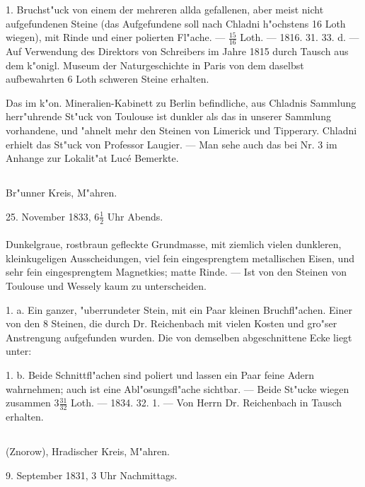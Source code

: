 \documentclass[a4paper, 11pt, oneside, polutonikogreek, german]{article}
\begin{document}
1. Bruchst"uck von einem der mehreren allda gefallenen, aber meist nicht aufgefundenen Steine (das Aufgefundene soll nach Chladni h"ochstens 16 Loth wiegen), mit Rinde und einer polierten Fl"ache. --- $\mathfrak{\frac{15}{16}}$ Loth. --- 1816. 31. 33. d. --- Auf Verwendung des Direktors von Schreibers im Jahre 1815 durch Tausch aus dem k"onigl. Museum der Naturgeschichte in Paris von dem daselbst aufbewahrten 6 Loth schweren Steine erhalten.

\setlength{\leftskip}{10mm}
\setlength{\parindent}{0pt}

{\footnotesize Das im k"on. Mineralien-Kabinett zu Berlin befindliche, aus Chladnis Sammlung herr"uhrende St"uck von Toulouse ist dunkler als das in unserer Sammlung vorhandene, und "ahnelt mehr den Steinen von Limerick und Tipperary. Chladni erhielt das St"uck von Professor Laugier. --- Man sehe auch das bei Nr. 3 im Anhange zur Lokalit"at Lucé Bemerkte.}

\setlength{\leftskip}{0pt}
\setlength{\parindent}{20pt}

\subsection{}
\begin{center}

Br"unner Kreis, M"ahren.

25. November 1833, $\mathfrak{6\frac{1}{2}}$ Uhr Abends.
\end{center}
\paragraph{}
Dunkelgraue, rostbraun gefleckte Grundmasse, mit ziemlich vielen dunkleren, kleinkugeligen Ausscheidungen, viel fein eingesprengtem metallischen Eisen, und sehr fein eingesprengtem Magnetkies; matte Rinde. --- Ist von den Steinen von Toulouse und Wessely kaum zu unterscheiden.

1. a. Ein ganzer, "uberrundeter Stein, mit ein Paar kleinen Bruchfl"achen. Einer von den 8 Steinen, die durch Dr. Reichenbach mit vielen Kosten und gro"ser Anstrengung aufgefunden wurden. Die von demselben abgeschnittene Ecke liegt unter:

1. b. Beide Schnittfl"achen sind poliert und lassen ein Paar feine Adern wahrnehmen; auch ist eine Abl"osungsfl"ache sichtbar. --- Beide St"ucke wiegen zusammen $\mathfrak{3\frac{31}{32}}$ Loth. --- 1834. 32. 1. --- Von Herrn Dr. Reichenbach in Tausch erhalten.
\subsection{}
\begin{center}

(Znorow), Hradischer Kreis, M"ahren.

9. September 1831, 3 Uhr Nachmittags.
\end{center}
\end{document}
